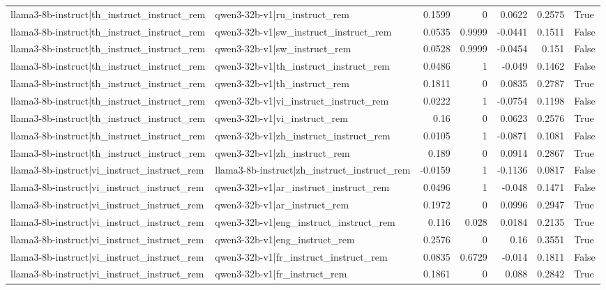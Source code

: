 \begin{table}
\begin{tabular}{l l r r r r l}
llama3-8b-instruct|th_instruct_instruct_rem & qwen3-32b-v1|ru_instruct_rem & 0.1599 & 0 & 0.0622 & 0.2575 & True \\
llama3-8b-instruct|th_instruct_instruct_rem & qwen3-32b-v1|sw_instruct_instruct_rem & 0.0535 & 0.9999 & -0.0441 & 0.1511 & False \\
llama3-8b-instruct|th_instruct_instruct_rem & qwen3-32b-v1|sw_instruct_rem & 0.0528 & 0.9999 & -0.0454 & 0.151 & False \\
llama3-8b-instruct|th_instruct_instruct_rem & qwen3-32b-v1|th_instruct_instruct_rem & 0.0486 & 1 & -0.049 & 0.1462 & False \\
llama3-8b-instruct|th_instruct_instruct_rem & qwen3-32b-v1|th_instruct_rem & 0.1811 & 0 & 0.0835 & 0.2787 & True \\
llama3-8b-instruct|th_instruct_instruct_rem & qwen3-32b-v1|vi_instruct_instruct_rem & 0.0222 & 1 & -0.0754 & 0.1198 & False \\
llama3-8b-instruct|th_instruct_instruct_rem & qwen3-32b-v1|vi_instruct_rem & 0.16 & 0 & 0.0623 & 0.2576 & True \\
llama3-8b-instruct|th_instruct_instruct_rem & qwen3-32b-v1|zh_instruct_instruct_rem & 0.0105 & 1 & -0.0871 & 0.1081 & False \\
llama3-8b-instruct|th_instruct_instruct_rem & qwen3-32b-v1|zh_instruct_rem & 0.189 & 0 & 0.0914 & 0.2867 & True \\
llama3-8b-instruct|vi_instruct_instruct_rem & llama3-8b-instruct|zh_instruct_instruct_rem & -0.0159 & 1 & -0.1136 & 0.0817 & False \\
llama3-8b-instruct|vi_instruct_instruct_rem & qwen3-32b-v1|ar_instruct_instruct_rem & 0.0496 & 1 & -0.048 & 0.1471 & False \\
llama3-8b-instruct|vi_instruct_instruct_rem & qwen3-32b-v1|ar_instruct_rem & 0.1972 & 0 & 0.0996 & 0.2947 & True \\
llama3-8b-instruct|vi_instruct_instruct_rem & qwen3-32b-v1|eng_instruct_instruct_rem & 0.116 & 0.028 & 0.0184 & 0.2135 & True \\
llama3-8b-instruct|vi_instruct_instruct_rem & qwen3-32b-v1|eng_instruct_rem & 0.2576 & 0 & 0.16 & 0.3551 & True \\
llama3-8b-instruct|vi_instruct_instruct_rem & qwen3-32b-v1|fr_instruct_instruct_rem & 0.0835 & 0.6729 & -0.014 & 0.1811 & False \\
llama3-8b-instruct|vi_instruct_instruct_rem & qwen3-32b-v1|fr_instruct_rem & 0.1861 & 0 & 0.088 & 0.2842 & True \\

\end{tabular}
\end{table}
